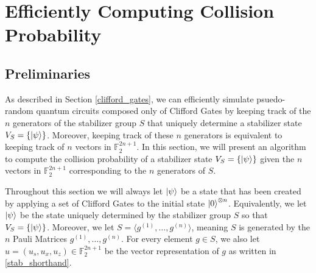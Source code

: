 \message{ !name(report_1.tex)}\documentclass[11pt]{article}
\theoremstyle{definition}
\theoremstyle{plain}
\begin{document}
\section{Efficiently Computing Collision Probability}

\subsection{Preliminaries}
As described in Section {\ref{clifford_gates}}, we can efficiently simulate psuedo-random quantum circuits composed only of Clifford Gates by keeping track of the $n$ generators of the stabilizer group $S$ that uniquely determine a stabilizer state $V_S = \{ \ket{\psi} \}$. Moreover, keeping track of these $n$ generators is equivalent to keeping track of $n$ vectors in $\mathbb{F}_2^{2n+1}$. In this section, we will present an algorithm to compute the collision probability of a stabilizer state $V_S = \{ \ket{\psi} \}$ given the $n$ vectors in $\mathbb{F}_2^{2n+1}$ corresponding to the $n$ generators of $S$.

Throughout this section we will always let $\ket{\psi}$ be a state that has been created by applying a set of Clifford Gates to the initial state $\ket{0}^{\otimes n}$. Equivalently, we let $\ket{\psi}$ be the state uniquely determined by the stabilizer group $S$ so that $V_S = \{ \ket{\psi} \}$. Moreover, we let $S = \langle g^{(1)}, \ldots, g^{(n)} \rangle$, meaning $S$ is generated by the $n$ Pauli Matrices $g^{(1)}, \ldots, g^{(n)}$. For every element $g \in S$, we also let $u = (u_s, u_x, u_z) \in \mathbb{F}_2^{2n+1}$ be the vector representation of $g$ as written in {\ref{stab_shorthand}}.
\end{document}
